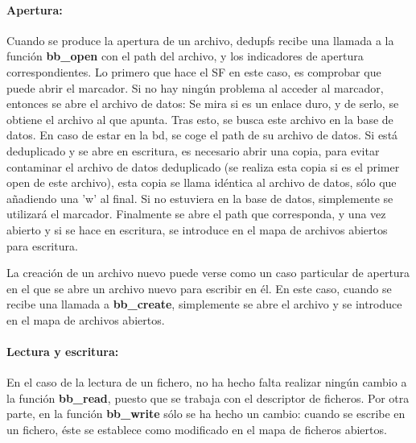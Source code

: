 \documentclass[12pt,a4paper]{article}
\begin{document}
\paragraph{Apertura:}
Cuando se produce la apertura de un archivo, dedupfs recibe una llamada a la función \textbf{bb\_open} con el path del archivo, y los indicadores de apertura correspondientes. Lo primero que hace el SF en este caso, es comprobar que puede abrir el marcador. Si no hay ningún problema al acceder al marcador, entonces se abre el archivo de datos: Se mira si es un enlace duro, y de serlo, se obtiene el archivo al que apunta. Tras esto, se busca este archivo en la base de datos. En caso de estar en la bd, se coge el path de su archivo de datos. Si está deduplicado y se abre en escritura, es necesario abrir una copia, para evitar contaminar el archivo de datos deduplicado (se realiza esta copia si es el primer open de este archivo), esta copia se llama idéntica al archivo de datos, sólo que añadiendo una 'w' al final.
Si no estuviera en la base de datos, simplemente se utilizará el marcador.
Finalmente se abre el path que corresponda, y una vez abierto y si se hace en escritura, se introduce en el mapa de archivos abiertos para escritura.

La creación de un archivo nuevo puede verse como un caso particular de apertura en el que se abre un archivo nuevo para escribir en él. En este caso, cuando se recibe una llamada a \textbf{bb\_create}, simplemente se abre el archivo y se introduce en el mapa de archivos abiertos.

\paragraph{Lectura y escritura:}
En el caso de la lectura de un fichero, no ha hecho falta realizar ningún cambio a la función \textbf{bb\_read}, puesto que se trabaja con el descriptor de ficheros. Por otra parte, en la función \textbf{bb\_write} sólo se ha hecho un cambio: cuando se escribe en un fichero, éste se establece como modificado en el mapa de ficheros abiertos.
\end{document}
